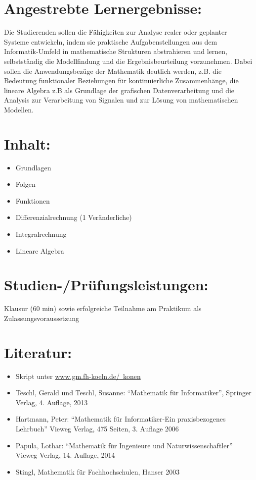 \section*{Angestrebte
Lernergebnisse:}\label{angestrebte-lernergebnisse-13}

Die Studierenden sollen die Fähigkeiten zur Analyse realer oder
geplanter Systeme entwickeln, indem sie praktische Aufgabenstellungen
aus dem Informatik-Umfeld in mathematische Strukturen abstrahieren und
lernen, selbstständig die Modellfindung und die Ergebnisbeurteilung
vorzunehmen. Dabei sollen die Anwendungsbezüge der Mathematik deutlich
werden, z.B. die Bedeutung funktionaler Beziehungen für kontinuierliche
Zusammenhänge, die lineare Algebra z.B als Grundlage der grafischen
Datenverarbeitung und die Analysis zur Verarbeitung von Signalen und zur
Lösung von mathematischen Modellen.

\section*{Inhalt:}\label{inhalt-13}

\begin{itemize}
\tightlist
\item
  Grundlagen
\item
  Folgen
\item
  Funktionen
\item
  Differenzialrechnung (1 Veränderliche)
\item
  Integralrechnung
\item
  Lineare Algebra
\end{itemize}

\section*{Studien-/Prüfungsleistungen:}\label{studien-pruxfcfungsleistungen-11}

Klausur (60 min) sowie erfolgreiche Teilnahme am Praktikum als
Zulassungsvoraussetzung

\section*{Literatur:}\label{literatur-10}

\begin{itemize}
\tightlist
\item
  Skript unter \href{www.gm.fh-koeln.de/~konen}{www.gm.fh-koeln.de/~konen}
\item
  Teschl, Gerald und Teschl, Susanne: ``Mathematik für Informatiker'',
  Springer Verlag, 4. Auflage, 2013
\item
  Hartmann, Peter: ``Mathematik für Informatiker-Ein praxisbezogenes
  Lehrbuch'' Vieweg Verlag, 475 Seiten, 3. Auflage 2006
\item
  Papula, Lothar: ``Mathematik für Ingenieure und Naturwissenschaftler''
  Vieweg Verlag, 14. Auflage, 2014
\item
  Stingl, Mathematik für Fachhochschulen, Hanser 2003
\end{itemize}

